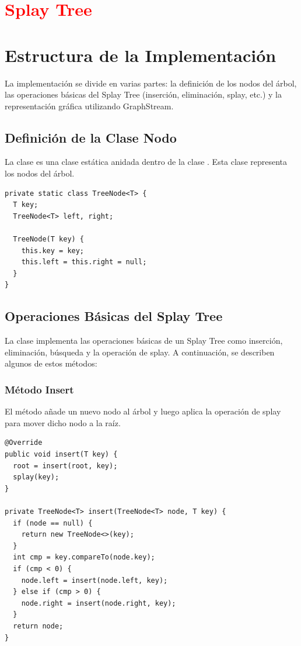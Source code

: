 \section{\textcolor{red}{Splay Tree}}
\section{Estructura de la Implementación}
La implementación se divide en varias partes: la definición de los nodos del árbol, las operaciones básicas del Splay Tree (inserción, eliminación, splay, etc.) y la representación gráfica utilizando GraphStream.

\subsection{Definición de la Clase Nodo}
La clase  es una clase estática anidada dentro de la clase . Esta clase representa los nodos del árbol.
\begin{verbatim}
private static class TreeNode<T> {
  T key;
  TreeNode<T> left, right;

  TreeNode(T key) {
    this.key = key;
    this.left = this.right = null;
  }
}
\end{verbatim}

\subsection{Operaciones Básicas del Splay Tree}
La clase  implementa las operaciones básicas de un Splay Tree como inserción, eliminación, búsqueda y la operación de splay. A continuación, se describen algunos de estos métodos:

\subsubsection{Método Insert}
El método  añade un nuevo nodo al árbol y luego aplica la operación de splay para mover dicho nodo a la raíz.
\begin{verbatim}
@Override
public void insert(T key) {
  root = insert(root, key);
  splay(key);
}

private TreeNode<T> insert(TreeNode<T> node, T key) {
  if (node == null) {
    return new TreeNode<>(key);
  }
  int cmp = key.compareTo(node.key);
  if (cmp < 0) {
    node.left = insert(node.left, key);
  } else if (cmp > 0) {
    node.right = insert(node.right, key);
  }
  return node;
}
\end{verbatim}

